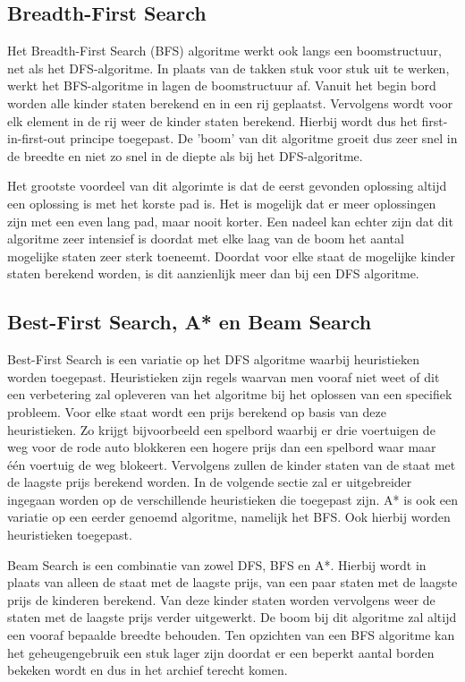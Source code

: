 \documentclass[a4paper]{article}
\begin{document}
\subsection{Breadth-First Search}
Het Breadth-First Search (BFS) algoritme werkt ook langs een boomstructuur, net als het DFS-algoritme. In plaats van de takken stuk voor stuk uit te werken, werkt het BFS-algoritme in lagen de boomstructuur af. Vanuit het begin bord worden alle kinder staten berekend en in een rij geplaatst. Vervolgens wordt voor elk element in de rij weer de kinder staten berekend. Hierbij wordt dus het first-in-first-out principe toegepast. De 'boom' van dit algoritme groeit dus zeer snel in de breedte en niet zo snel in de diepte als bij het DFS-algoritme. 
	
    Het grootste voordeel van dit algorimte is dat de eerst gevonden oplossing altijd een oplossing is met het korste pad is. Het is mogelijk dat er meer oplossingen zijn met een even lang pad, maar nooit korter. Een nadeel kan echter zijn dat dit algoritme zeer intensief is doordat met elke laag van de boom het aantal mogelijke staten zeer sterk toeneemt. Doordat voor elke staat de mogelijke kinder staten berekend worden, is dit aanzienlijk meer dan bij een DFS algoritme.

\subsection{Best-First Search, A* en Beam Search}
Best-First Search is een variatie op het DFS algoritme waarbij heuristieken worden toegepast. Heuristieken zijn regels waarvan men vooraf niet weet of dit een verbetering zal opleveren van het algoritme bij het oplossen van een specifiek probleem. Voor elke staat wordt een prijs berekend op basis van deze heuristieken. Zo krijgt bijvoorbeeld een spelbord waarbij er drie voertuigen de weg voor de rode auto blokkeren een hogere prijs dan een spelbord waar maar één voertuig de weg blokeert. Vervolgens zullen de kinder staten van de staat met de laagste prijs berekend worden. In de volgende sectie zal er uitgebreider ingegaan worden op de verschillende heuristieken die toegepast zijn. A* is ook een variatie op een eerder genoemd algoritme, namelijk het BFS. Ook hierbij worden heuristieken toegepast.
	
    Beam Search is een combinatie van zowel DFS, BFS en A*. Hierbij wordt in plaats van alleen de staat met de laagste prijs, van een paar staten met de laagste prijs de kinderen berekend. Van deze kinder staten worden vervolgens weer de staten met de laagste prijs verder uitgewerkt. De boom bij dit algoritme zal altijd een vooraf bepaalde breedte behouden. Ten opzichten van een BFS algoritme kan het geheugengebruik een stuk lager zijn doordat er een beperkt aantal borden bekeken wordt en dus in het archief terecht komen.
\end{document}
